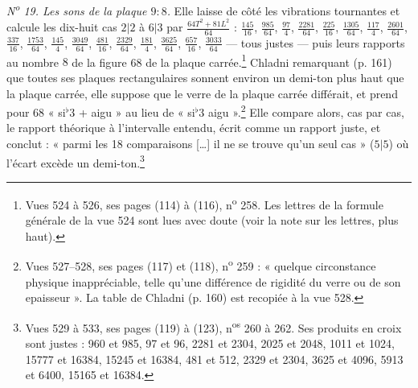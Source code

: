 \documentclass[11pt,a4paper]{article}
\begin{document}
\emph{N\textsuperscript{o} 19. Les sons de la plaque $9:8$.} Elle laisse de
côté les vibrations tournantes et calcule les dix-huit cas $2|2$ à $6|3$ par
$\frac{64T^2+81L^2}{64}$ : $\frac{145}{16}$, $\frac{985}{64}$, $\frac{97}{4}$,
$\frac{2281}{64}$, $\frac{225}{16}$, $\frac{1305}{64}$, $\frac{117}{4}$,
$\frac{2601}{64}$, $\frac{337}{16}$, $\frac{1753}{64}$, $\frac{145}{4}$,
$\frac{3049}{64}$, $\frac{481}{16}$, $\frac{2329}{64}$, $\frac{181}{4}$,
$\frac{3625}{64}$, $\frac{657}{16}$, $\frac{3033}{64}$ — tous justes — puis
leurs rapports au nombre $8$ de la figure 68 de la plaque carrée.\footnote{Vues
524 à 526, ses pages (114) à (116), n\textsuperscript{o} 258. Les lettres de la
formule générale de la vue 524 sont lues avec doute (voir la note sur les
lettres, plus haut).} Chladni remarquant (p. 161) que toutes ses plaques
rectangulaires sonnent environ un demi-ton plus haut que la plaque carrée, elle
suppose que le verre de la plaque carrée différait, et prend pour 68
« si$^{\flat}$3 + aigu » au lieu de « si$^{\flat}$3 aigu ».\footnote{Vues
527--528, ses pages (117) et (118), n\textsuperscript{o} 259 : « quelque
circonstance physique inappréciable, telle qu'une différence de rigidité du
verre ou de son epaisseur ». La table de Chladni (p. 160) est recopiée à la vue
528.} Elle compare alors, cas par cas, le rapport théorique à l'intervalle
entendu, écrit comme un rapport juste, et conclut : « parmi les 18 comparaisons
[…] il ne se trouve qu'un seul cas » ($5|5$) où l'écart excède un
demi-ton.\footnote{Vues 529 à 533, ses pages (119) à (123), n\textsuperscript{os}
260 à 262. Ses produits en croix sont justes : 960 et 985, 97 et 96, 2281 et
2304, 2025 et 2048, 1011 et 1024, 15777 et 16384, 15245 et 16384, 481 et 512,
2329 et 2304, 3625 et 4096, 5913 et 6400, 15165 et 16384.}
\end{document}
